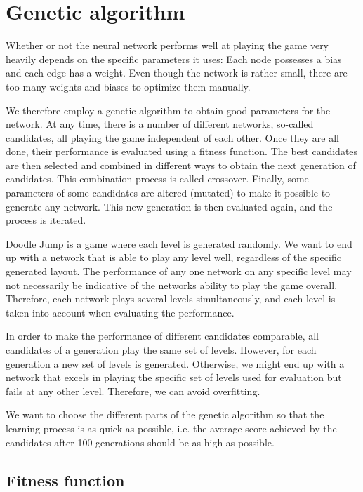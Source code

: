 \documentclass[a4paper,12pt,pagesize,headsepline,bibtotoc,titlepage,abstracton]{scrartcl}
\begin{document}
\section{Genetic algorithm}
\label{sec:ga}

Whether or not the neural network performs well at playing the game very heavily depends on the specific parameters it uses: Each node possesses a bias and each edge has a weight. Even though the network is rather small, there are too many weights and biases to optimize them manually. 

We therefore employ a genetic algorithm to obtain good parameters for the network. At any time, there is a number of different networks, so-called candidates, all playing the game independent of each other. Once they are all done, their performance is evaluated using a fitness function. The best candidates are then selected and combined in different ways to obtain the next generation of candidates. This combination process is called crossover. Finally, some parameters of some candidates are altered (mutated) to make it possible to generate any network. This new generation is then evaluated again, and the process is iterated.

Doodle Jump is a game where each level is generated randomly. We want to end up with a network that is able to play any level well, regardless of the specific generated layout. The performance of any one network on any specific level may not necessarily be indicative of the networks ability to play the game overall. Therefore, each network plays several levels simultaneously, and each level is taken into account when evaluating the performance.

In order to make the performance of different candidates comparable, all candidates of a generation play the same set of levels. However, for each generation a new set of levels is generated. Otherwise, we might end up with a network that excels in playing the specific set of levels used for evaluation but fails at any other level. Therefore, we can avoid overfitting.

We want to choose the different parts of the genetic algorithm so that the learning process is as quick as possible, i.e. the average score achieved by the candidates after 100 generations should be as high as possible.

\subsection{Fitness function}
\end{document}

